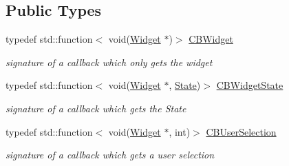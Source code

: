 \subsection*{Public Types}
\begin{DoxyCompactItemize}
\item 
typedef std\+::function$<$ void(\hyperlink{classcanvascv_1_1Widget}{Widget} $\ast$)$>$ \hyperlink{classcanvascv_1_1Widget_ad27bca771ee1c14454c77c91d9d49925}{C\+B\+Widget}\hypertarget{classcanvascv_1_1Widget_ad27bca771ee1c14454c77c91d9d49925}{}\label{classcanvascv_1_1Widget_ad27bca771ee1c14454c77c91d9d49925}

\begin{DoxyCompactList}\small\item\em signature of a callback which only gets the widget \end{DoxyCompactList}\item 
typedef std\+::function$<$ void(\hyperlink{classcanvascv_1_1Widget}{Widget} $\ast$, \hyperlink{classcanvascv_1_1Widget_afc39a6533455cbc3161ae3a021da0dc8}{State})$>$ \hyperlink{classcanvascv_1_1Widget_a410a6951e3d1f30b87702577a389d937}{C\+B\+Widget\+State}\hypertarget{classcanvascv_1_1Widget_a410a6951e3d1f30b87702577a389d937}{}\label{classcanvascv_1_1Widget_a410a6951e3d1f30b87702577a389d937}

\begin{DoxyCompactList}\small\item\em signature of a callback which gets the State \end{DoxyCompactList}\item 
typedef std\+::function$<$ void(\hyperlink{classcanvascv_1_1Widget}{Widget} $\ast$, int)$>$ \hyperlink{classcanvascv_1_1Widget_a977cbd39cf203c5866f07f3645c7e4bc}{C\+B\+User\+Selection}\hypertarget{classcanvascv_1_1Widget_a977cbd39cf203c5866f07f3645c7e4bc}{}\label{classcanvascv_1_1Widget_a977cbd39cf203c5866f07f3645c7e4bc}

\begin{DoxyCompactList}\small\item\em signature of a callback which gets a user selection \end{DoxyCompactList}\end{DoxyCompactItemize}
